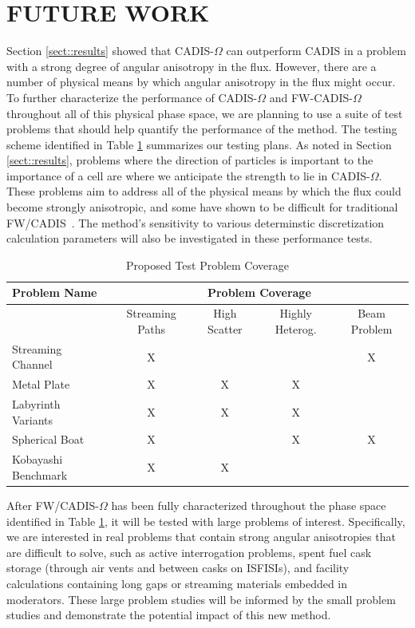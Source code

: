 \documentclass[12pt]{article}
\begin{document}
%
\section{FUTURE WORK} 
\label{sect::future}
 
Section \ref{sect::results} showed that CADIS-$\Omega$ can outperform CADIS in a problem with a strong degree of angular anisotropy in the flux. However, there are a number of physical means by which angular anisotropy in the flux might occur. To further characterize the performance of CADIS-$\Omega$ and FW-CADIS-$\Omega$ throughout all of this physical phase space, we are planning to use a suite of test problems that should help quantify the performance of the method. The testing scheme identified in Table \ref{tab:testprobs} summarizes our testing plans. As noted in Section \ref{sect::results}, problems where the direction of particles is important to the importance of a cell are where we anticipate the strength to lie in CADIS-$\Omega$. These problems aim to address all of the physical means by which the flux could become strongly anisotropic, and some have shown to be difficult for traditional FW/CADIS~\citep{Peplow-ORNL}. The method's sensitivity to various determinstic discretization calculation parameters will also be investigated in these performance tests. 

 \begin{table}
  \centering
  \caption{Proposed Test Problem Coverage}
  \begin{tabular}{l|cccc}
    \toprule
    Problem Name & \multicolumn{4}{c}{Problem Coverage} \\
    \hline
     & Streaming Paths & High Scatter & Highly Heterog. & Beam Problem \\
    \hline
    Streaming Channel   & X & & & X \\ 
    Metal Plate         & X & X & X &  \\
    Labyrinth Variants  & X & X & X &  \\ 
    Spherical Boat      & X & & X & X \\  
    Kobayashi Benchmark & X & X &  &  \\   
	\bottomrule
  \end{tabular}
  \label{tab:testprobs}
\end{table}

After FW/CADIS-$\Omega$ has been fully characterized throughout the phase space identified in Table \ref{tab:testprobs}, it will be tested with large problems of interest. 
Specifically, we are interested in real problems that contain strong angular anisotropies that are difficult to solve, such as active interrogation problems, spent fuel cask storage (through air vents and between casks on ISFISIs), and facility calculations containing long gaps or streaming materials embedded in moderators. 
These large problem studies will be informed by the small problem studies and demonstrate the potential impact of this new method. 
\end{document}
